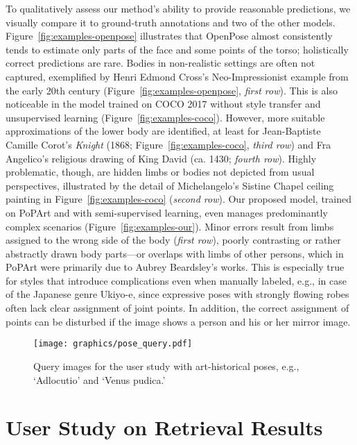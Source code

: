 \documentclass[sigconf]{acmart}
\begin{document}
To qualitatively assess our method's ability to provide reasonable predictions, we visually compare it to ground-truth annotations and two of the other models. 
Figure~\ref{fig:examples-openpose} illustrates that OpenPose almost consistently tends to estimate only parts of the face and some points of the torso; holistically correct predictions are rare. 
Bodies in non-realistic settings are often not captured, exemplified by Henri Edmond Cross's Neo-Impressionist example from the early 20th century (Figure~\ref{fig:examples-openpose}, \textit{first row}). 
This is also noticeable in the model trained on COCO 2017 without style transfer and unsupervised learning (Figure~\ref{fig:examples-coco}). 
However, more suitable approximations of the lower body are identified, at least for Jean-Baptiste Camille Corot's \textit{Knight} (1868; Figure~\ref{fig:examples-coco}, \textit{third row}) and Fra Angelico's religious drawing of King David (ca. 1430; \textit{fourth row}). 
Highly problematic, though, are hidden limbs or bodies not depicted from usual perspectives, illustrated by the detail of Michelangelo's Sistine Chapel ceiling painting in Figure~\ref{fig:examples-coco} (\textit{second row}). 
Our proposed model, trained on \ac{PoPArt} and with semi-supervised learning, even manages predominantly complex scenarios (Figure~\ref{fig:examples-our}). 
Minor errors result from limbs assigned to the wrong side of the body (\textit{first row}), poorly contrasting or rather abstractly drawn body parts---or overlaps with limbs of other persons, which in \ac{PoPArt} were primarily due to Aubrey Beardsley's works. 
This is especially true for styles that introduce complications even when manually labeled, e.g., in case of the Japanese genre Ukiyo-e, since expressive poses with strongly flowing robes often lack clear assignment of joint points. 
In addition, the correct assignment of points can be disturbed if the image shows a person and his or her mirror image.


\begin{figure}
\centering 
\texttt{[image: graphics/pose\_query.pdf]}
\caption{Query images for the user study with art-historical poses, e.g., \enquote*{Adlocutio} and \enquote*{Venus pudica.}}
\label{fig:pose-query}
\end{figure}

\section{User Study on Retrieval Results}
\label{chp:study}
\end{document}

